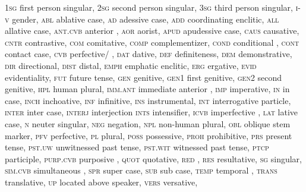 \documentclass[output=paper]{LSP/langsci}
\begin{document}
\textsc{1sg}		first person singular,
\textsc{2sg}		second person singular,
\textsc{3sg} 		third person singular,
\textsc{i-v}		gender,
\textsc{abl}		ablative case,
\textsc{ad}		adessive case,
\textsc{add}		coordinating enclitic,
\textsc{all}		allative case,
\textsc{ant.cvb}	anterior ,
\textsc{aor}		aorist,
\textsc{apud}		apudessive case,
\textsc{caus}		causative,
\textsc{cntr}		contrastive,
\textsc{com}		comitative,
\textsc{comp}		complementizer,	
\textsc{cond}		conditional ,
\textsc{cont}		contact case,
\textsc{cvb}		perfective/ ,
\textsc{dat}		dative,
\textsc{def}		definiteness,
\textsc{dem}		demonstrative,
\textsc{dir}		directional,
\textsc{dist}		distal,
\textsc{emph}		emphatic enclitic,
\textsc{erg}		ergative,
\textsc{evid}		evidentiality,
\textsc{fut}		future tense,
\textsc{gen}		genitive,
\textsc{gen1}		first genitive,
\textsc{gen2} 		second genitive,
\textsc{hpl}		human plural,
\textsc{imm.ant}	immediate anterior ,
\textsc{imp}		imperative,
\textsc{in}		in case,
\textsc{inch}		inchoative,
\textsc{inf}		infinitive,
\textsc{ins}		instrumental,
\textsc{int}		interrogative particle,
\textsc{inter} 		inter case,
\textsc{interj}	interjection
\textsc{ints}		intensifier,
\textsc{icvb}		imperfective ,
\textsc{lat}		lative case,
\textsc{n}		neuter singular,
\textsc{neg}		negation,
\textsc{npl}		non-human plural,
\textsc{obl}		oblique stem marker,
\textsc{pfv}		perfective,
\textsc{pl}		plural,
\textsc{poss}		possessive,
\textsc{proh}		prohibitive,
\textsc{prs}		present tense,
\textsc{pst.uw}		unwitnessed past tense,
\textsc{pst.wit}		witnessed past tense,
\textsc{ptcp}		participle,
\textsc{purp.cvb}	purposive ,
\textsc{quot}		quotative,
\textsc{red}		,
\textsc{res}		resultative,
\textsc{sg}		singular,
\textsc{sim.cvb}	simultaneous ,
\textsc{spr}		super case, 
\textsc{sub}		sub case,
\textsc{temp}		temporal ,
\textsc{trans}	translative,
\textsc{up}		located above speaker,
\textsc{vers}		versative,



\printbibliography[heading=subbibliography,notkeyword=this]
\end{document}
